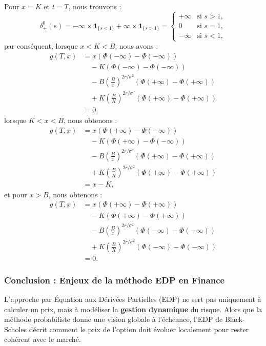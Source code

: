 \documentclass[11pt]{article}
\begin{document}
Pour $x = K$ et $t = T$, nous trouvons :
\begin{equation*}
\delta_{\pm}^{0}(s) = -\infty \times \mathbf{1}_{\{s < 1\}} + \infty \times \mathbf{1}_{\{s > 1\}} = 
\begin{cases} 
+\infty & \text{si } s > 1, \\ 
0 & \text{si } s = 1, \\ 
-\infty & \text{si } s < 1, 
\end{cases}
\end{equation*}
par conséquent, lorsque $x < K < B$, nous avons :
\begin{align*}
g(T, x) &= x (\Phi(-\infty) - \Phi(-\infty)) \\
&\quad - K (\Phi(-\infty) - \Phi(-\infty)) \\
&\quad - B \left( \frac{B}{x} \right)^{2r/\sigma^2} (\Phi(+\infty) - \Phi(+\infty)) \\
&\quad + K \left( \frac{B}{K} \right)^{2r/\sigma^2} (\Phi(+\infty) - \Phi(+\infty)) \\
&= 0,
\end{align*}
lorsque $K < x < B$, nous obtenons :
\begin{align*}
g(T, x) &= x (\Phi(+\infty) - \Phi(-\infty)) \\
&\quad - K (\Phi(+\infty) - \Phi(-\infty)) \\
&\quad - B \left( \frac{B}{x} \right)^{2r/\sigma^2} (\Phi(+\infty) - \Phi(+\infty)) \\
&\quad + K \left( \frac{B}{K} \right)^{2r/\sigma^2} (\Phi(+\infty) - \Phi(+\infty)) \\
&= x - K,
\end{align*}
et pour $x > B$, nous obtenons :
\begin{align*}
g(T, x) &= x (\Phi(+\infty) - \Phi(+\infty)) \\
&\quad - K (\Phi(+\infty) - \Phi(+\infty)) \\
&\quad - B \left( \frac{B}{x} \right)^{2r/\sigma^2} (\Phi(-\infty) - \Phi(-\infty)) \\
&\quad + K \left( \frac{B}{K} \right)^{2r/\sigma^2} (\Phi(-\infty) - \Phi(-\infty)) \\
&= 0.
\end{align*}

\subsubsection*{Conclusion : Enjeux de la méthode EDP en Finance}

L'approche par Équation aux Dérivées Partielles (EDP) ne sert pas uniquement à calculer un prix, mais à modéliser la \textbf{gestion dynamique} du risque. Alors que la méthode probabiliste donne une vision globale à l'échéance, l'EDP de Black-Scholes décrit comment le prix de l'option doit évoluer localement pour rester cohérent avec le marché. 
\end{document}
